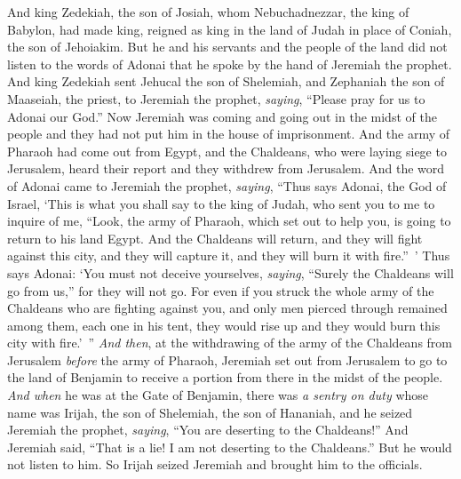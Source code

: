 \begin{biblechapter} %
 And king Zedekiah, the son of Josiah, whom Nebuchadnezzar, the king of Babylon, had made king, reigned as king in the land of Judah in place of Coniah, the son of Jehoiakim.
\verse But he and his servants and the people of the land did not listen to the words of Adonai that he spoke by the hand of Jeremiah the prophet.
\verse And king Zedekiah sent Jehucal the son of Shelemiah, and Zephaniah the son of Maaseiah, the priest, to Jeremiah the prophet, \textit{saying}, “Please pray for us to Adonai our God.”
\verse Now Jeremiah was coming and going out in the midst of the people and they had not put him in the house of imprisonment.
\verse And the army of Pharaoh had come out from Egypt, and the Chaldeans, who were laying siege to Jerusalem, heard their report and they withdrew from Jerusalem.
\verse And the word of Adonai came to Jeremiah the prophet, \textit{saying},
\verse “Thus says Adonai, the God of Israel, ‘This is what you shall say to the king of Judah, who sent you to me to inquire of me, “Look, the army of Pharaoh, which set out to help you, is going to return to his land Egypt.
\verse And the Chaldeans will return, and they will fight against this city, and they will capture it, and they will burn it with fire.” ’
\verse Thus says Adonai: ‘You must not deceive yourselves, \textit{saying}, “Surely the Chaldeans will go from us,” for they will not go.
\verse For even if you struck the whole army of the Chaldeans who are fighting against you, and only men pierced through remained among them, each one in his tent, they would rise up and they would burn this city with fire.’ ”
 \textit{And then}, at the withdrawing of the army of the Chaldeans from Jerusalem \textit{before} the army of Pharaoh,
\verse Jeremiah set out from Jerusalem to go to the land of Benjamin to receive a portion from there in the midst of the people.
\verse \textit{And when} he was at the Gate of Benjamin, there was \textit{a sentry on duty} whose name was Irijah, the son of Shelemiah, the son of Hananiah, and he seized Jeremiah the prophet, \textit{saying}, “You are deserting to the Chaldeans!”
\verse And Jeremiah said, “That is a lie! I am not deserting to the Chaldeans.” But he would not listen to him. So Irijah seized Jeremiah and brought him to the officials.

\end{biblechapter}
